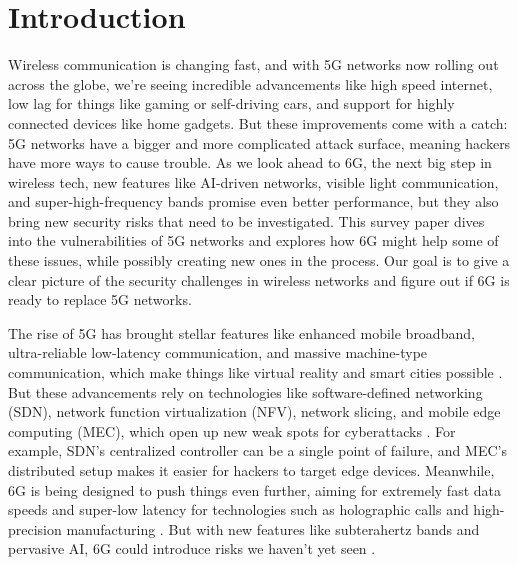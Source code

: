 \documentclass[acmtog]{acmart}
\begin{document}

\maketitle

\section{Introduction}

Wireless communication is changing fast, and with 5G networks now rolling out across the globe, we're seeing incredible advancements like high speed internet, low lag for things like gaming or self-driving cars, and support for highly connected devices like home gadgets. But these improvements come with a catch: 5G networks have a bigger and more complicated attack surface, meaning hackers have more ways to cause trouble. As we look ahead to 6G, the next big step in wireless tech, new features like AI-driven networks, visible light communication, and super-high-frequency bands promise even better performance, but they also bring new security risks that need to be investigated. This survey paper dives into the vulnerabilities of 5G networks and explores how 6G might help some of these issues, while possibly creating new ones in the process. Our goal is to give a clear picture of the security challenges in wireless networks and figure out if 6G is ready to replace 5G networks.

The rise of 5G has brought stellar features like enhanced mobile broadband, ultra-reliable low-latency communication, and massive machine-type communication, which make things like virtual reality and smart cities possible \cite{ref6}. But these advancements rely on technologies like software-defined networking (SDN), network function virtualization (NFV), network slicing, and mobile edge computing (MEC), which open up new weak spots for cyberattacks \cite{ref3}. For example, SDN’s centralized controller can be a single point of failure, and MEC’s distributed setup makes it easier for hackers to target edge devices. Meanwhile, 6G is being designed to push things even further, aiming for extremely fast data speeds and super-low latency for technologies such as holographic calls and high-precision manufacturing \cite{ref4}. But with new features like subterahertz bands and pervasive AI, 6G could introduce risks we haven’t yet seen \cite{ref4_1}.
\end{document}
